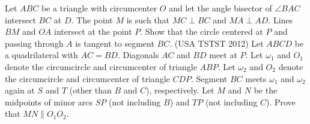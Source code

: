 \begin{enumerate}
  \ii Let $ABC$ be a triangle with circumcenter $O$ and let the angle bisector of $\angle BAC$ intersect $BC$ at $D$.  The point $M$ is such that $MC \perp BC$ and $MA \perp AD$.  Lines $BM$ and $OA$ intersect at the point $P$.  Show that the circle centered at $P$ and passing through $A$ is tangent to segment $BC$.
  \ii (USA TSTST 2012) Let $ABCD$ be a quadrilateral with $AC = BD$.  Diagonals $AC$ and $BD$ meet at $P$.  Let $\omega_1$ and $O_1$ denote the circumcircle and circumcenter of triangle $ABP$.  Let $\omega_2$ and $O_2$ denote the circumcircle and circumcenter of triangle $CDP$.  Segment $BC$ meets $\omega_1$ and $\omega_2$ again at $S$ and $T$ (other than $B$ and $C$), respectively.  Let $M$ and $N$ be the midpoints of minor arcs $SP$ (not including $B$) and $TP$ (not including $C$).  Prove that $MN \parallel O_1O_2$.
\end{enumerate}
